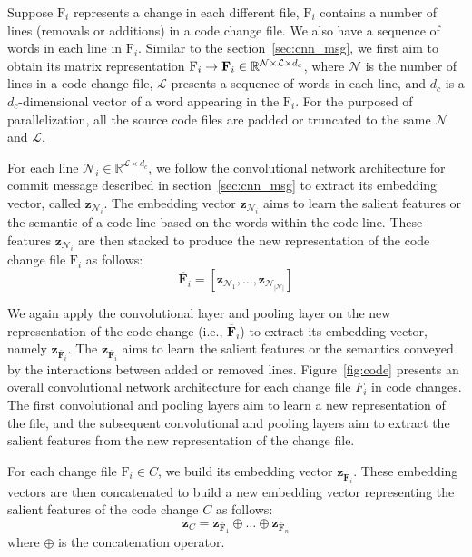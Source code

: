 Suppose $\text{F}_i$ represents a change in each different file, $\text{F}_i$ contains a number of lines (removals or additions) in a code change file. We also have a sequence of words in each line in $\text{F}_i$. Similar to the section~\ref{sec:cnn_msg}, we first aim to obtain its matrix representation $\text{F}_i \rightarrow \textbf{\text{F}}_i \in \mathbb{R}^{\mathcal{N} \times \mathcal{L} \times{d_c}}$, where $\mathcal{N}$ is the number of lines in a code change file, $\mathcal{L}$ presents a sequence of words in each line, and $d_c$ is a $d_c$-dimensional vector of a word appearing in the $\text{F}_i$. For the purposed of parallelization, all the source code files are padded or truncated to the same $\mathcal{N}$ and $\mathcal{L}$. 

For each line $\mathcal{N}_i \in \mathbb{R}^{\mathcal{L} \times d_c}$, we follow the convolutional network architecture for commit message described in section~\ref{sec:cnn_msg} to extract its embedding vector, called $\textbf{z}_{\mathcal{N}_i}$. The embedding vector $\textbf{z}_{\mathcal{N}_i}$ aims to learn the salient features or the semantic of a code line based on the words within the code line. These features $\textbf{z}_{\mathcal{N}_i}$ are then stacked to produce the new representation of the code change file $\text{F}_i$ as follows: 
\begin{equation}
\label{eq:concatenate}
\overline{\textbf{F}}_{i} = [\textbf{z}_{\mathcal{N}_1}, \dots, \textbf{z}_{\mathcal{N}_{|\mathcal{N}|}}]
\end{equation}

We again apply the convolutional layer and pooling layer on the new representation of the code change (i.e., $\overline{\textbf{F}}_{i}$) to extract its embedding vector, namely $\textbf{z}_{\overline{\textbf{F}}_{i}}$. The $\textbf{z}_{\overline{\textbf{F}}_{i}}$ aims to learn the salient features or the semantics conveyed by the interactions between added or removed lines. Figure~\ref{fig:code} presents an overall convolutional network architecture for each change file $F_i$ in code changes. The first convolutional and pooling layers aim to learn a new representation of the file, and the subsequent convolutional and pooling layers aim to extract the salient features from the new representation of the change file. 

For each change file $\text{F}_i \in C$, we build its embedding vector $\textbf{z}_{\overline{\textbf{F}}_{i}}$. These embedding vectors are then concatenated to build a new embedding vector representing the salient features of the code change $C$ as follows: 
\begin{equation}
\label{eq:concatenate_code}
\textbf{z}_C = \textbf{z}_{\overline{\textbf{F}}_{1}} \oplus \dots \oplus \textbf{z}_{\overline{\textbf{F}}_{n}}
\end{equation}
where $\oplus$ is the concatenation operator. 

